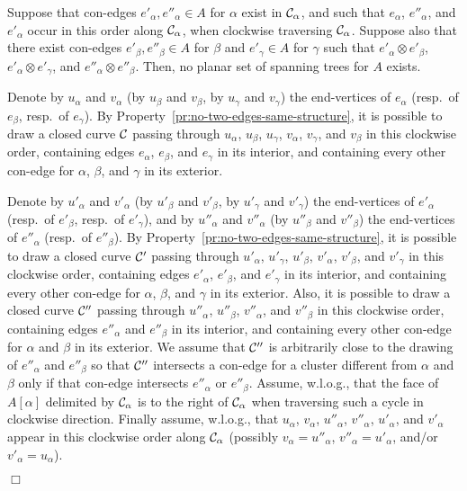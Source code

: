 \documentclass[letter,runningheads]{llncs}
\renewenvironment{proof}
{{\em Proof.\ }}{\hspace*{\fill}$\Box$\par\vspace{2mm}}
\newcommand{\conf}{\otimes}
\begin{document}
\begin{lemma}[{\sc Test 4}]\label{le:ababa}
Suppose that con-edges $e'_{\alpha},e''_{\alpha} \in A$ for $\alpha$ exist in ${\cal C}_{\alpha}$, and such that $e_{\alpha}$, $e''_{\alpha}$, and $e'_{\alpha}$ occur in this order along ${\cal C}_{\alpha}$, when clockwise traversing ${\cal C}_{\alpha}$. Suppose also that there exist con-edges $e'_{\beta},e''_{\beta} \in A$ for $\beta$ and $e'_{\gamma}\in A$ for $\gamma$ such that $e'_{\alpha}\conf e'_{\beta}$, $e'_{\alpha}\conf e'_{\gamma}$, and $e''_{\alpha}\conf e''_{\beta}$. Then, no planar set of spanning trees for $A$ exists.
\end{lemma}

\begin{proof}
Denote by $u_{\alpha}$ and $v_{\alpha}$ (by $u_{\beta}$ and $v_{\beta}$, by $u_{\gamma}$ and $v_{\gamma}$) the end-vertices of $e_{\alpha}$ (resp.\ of $e_{\beta}$, resp.\ of $e_{\gamma}$). By Property~\ref{pr:no-two-edges-same-structure}, it is possible to draw a closed curve $\cal C$ passing through $u_{\alpha}$, $u_{\beta}$, $u_{\gamma}$, $v_{\alpha}$, $v_{\gamma}$, and $v_{\beta}$ in this clockwise order, containing edges $e_{\alpha}$, $e_{\beta}$, and $e_{\gamma}$ in its interior, and containing every other con-edge for $\alpha$, $\beta$, and $\gamma$ in its exterior.

Denote by $u'_{\alpha}$ and $v'_{\alpha}$ (by $u'_{\beta}$ and $v'_{\beta}$, by $u'_{\gamma}$ and $v'_{\gamma}$) the end-vertices of $e'_{\alpha}$ (resp.\ of $e'_{\beta}$, resp.\ of $e'_{\gamma}$), and by $u''_{\alpha}$ and $v''_{\alpha}$ (by $u''_{\beta}$ and $v''_{\beta}$) the end-vertices of $e''_{\alpha}$ (resp.\ of $e''_{\beta}$). By Property~\ref{pr:no-two-edges-same-structure}, it is possible to draw a closed curve ${\cal C}'$ passing through $u'_{\alpha}$, $u'_{\gamma}$, $u'_{\beta}$, $v'_{\alpha}$, $v'_{\beta}$, and $v'_{\gamma}$ in this clockwise order, containing edges $e'_{\alpha}$, $e'_{\beta}$, and $e'_{\gamma}$ in its interior, and containing every other con-edge for $\alpha$, $\beta$, and $\gamma$ in its exterior. Also, it is possible to draw a closed curve ${\cal C}''$ passing through $u''_{\alpha}$, $u''_{\beta}$, $v''_{\alpha}$, and $v''_{\beta}$ in this clockwise order, containing edges $e''_{\alpha}$ and $e''_{\beta}$ in its interior, and containing every other con-edge for $\alpha$ and $\beta$ in its exterior. We assume that ${\cal C}''$ is arbitrarily close to the drawing of $e''_{\alpha}$ and $e''_{\beta}$ so that ${\cal C}''$ intersects a con-edge for a cluster different from $\alpha$ and $\beta$ only if that con-edge intersects $e''_{\alpha}$ or $e''_{\beta}$. Assume, w.l.o.g., that the face of $A[\alpha]$ delimited by ${\cal C}_{\alpha}$ is to the right of ${\cal C}_{\alpha}$ when traversing such a cycle in clockwise direction. Finally assume, w.l.o.g., that $u_{\alpha}$, $v_{\alpha}$, $u''_{\alpha}$, $v''_{\alpha}$, $u'_{\alpha}$, and $v'_{\alpha}$ appear in this clockwise order along ${\cal C}_{\alpha}$ (possibly $v_{\alpha}=u''_{\alpha}$, $v''_{\alpha}=u'_{\alpha}$, and/or $v'_{\alpha}=u_{\alpha}$).


\end{proof}
\end{document}
